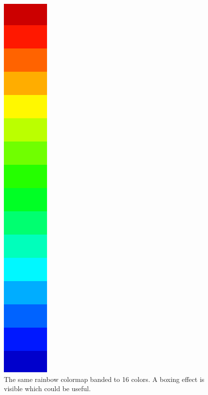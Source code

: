 		\begin{figure}[htb]
			  \centering
			  \includegraphics[angle=270, width=\linewidth, totalheight=1em, frame]{./content/pictures/rainbow_16.png}
			  \caption{The same rainbow colormap banded to 16 colors. A boxing effect is visible which could be useful.}
			  \label{fig:rainbow_banded}
		\end{figure}
